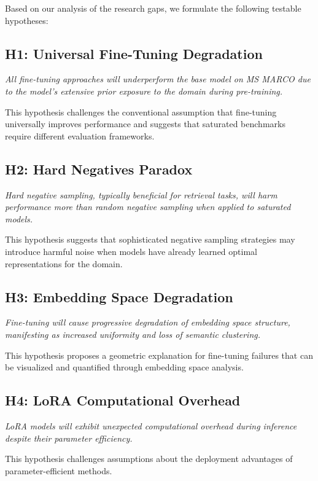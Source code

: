 Based on our analysis of the research gaps, we formulate the following testable hypotheses:

\subsection{H1: Universal Fine-Tuning Degradation}

\textit{All fine-tuning approaches will underperform the base model on MS MARCO due to the model's extensive prior exposure to the domain during pre-training.}

This hypothesis challenges the conventional assumption that fine-tuning universally improves performance and suggests that saturated benchmarks require different evaluation frameworks.

\subsection{H2: Hard Negatives Paradox}

\textit{Hard negative sampling, typically beneficial for retrieval tasks, will harm performance more than random negative sampling when applied to saturated models.}

This hypothesis suggests that sophisticated negative sampling strategies may introduce harmful noise when models have already learned optimal representations for the domain.

\subsection{H3: Embedding Space Degradation}

\textit{Fine-tuning will cause progressive degradation of embedding space structure, manifesting as increased uniformity and loss of semantic clustering.}

This hypothesis proposes a geometric explanation for fine-tuning failures that can be visualized and quantified through embedding space analysis.

\subsection{H4: LoRA Computational Overhead}

\textit{LoRA models will exhibit unexpected computational overhead during inference despite their parameter efficiency.}

This hypothesis challenges assumptions about the deployment advantages of parameter-efficient methods.

